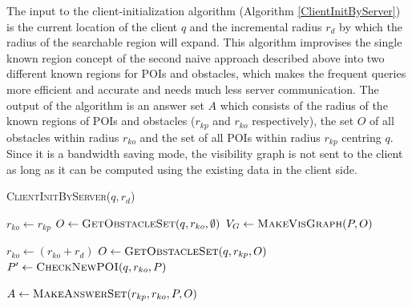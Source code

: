 \documentclass{sig-alternate}
\begin{document}
The input to the client-initialization algorithm (Algorithm \ref{ClientInitByServer}) is the current location of the client $q$ and the incremental radius $r_d$ by which the radius of the searchable region will expand. This algorithm improvises the single known region concept of the second naive approach described above into two different known regions for POIs and obstacles, which makes the frequent queries more efficient and accurate and needs much less server communication. The output of the algorithm is an answer set $A$ which consists of the radius of the known regions of POIs and obstacles ($r_{kp}$ and $r_{ko}$ respectively), the set $O$ of all obstacles within radius $r_{ko}$ and the set of all POIs within radius $r_{kp}$ centring $q$. Since it is a bandwidth saving mode, the visibility graph is not sent to the client as long as it can be computed using the existing data in the client side.

\begin{algorithm}
\caption{\textsc{ClientInitByServer}($q, r_d$)}
\label{ClientInitByServer}

    
	 $r_{ko} \gets r_{kp} $ \; %
	 $O \gets \textsc{GetObstacleSet}(q, r_{ko}, \emptyset)$ \;
	 $V_G \gets \textsc{MakeVisGraph}(P, O)$ \;
	  { 
		$r_{ko} \gets (r_{ko} + r_d)$ \;
		$O \gets \textsc{GetObstacleSet}(q, r_{kp}, O)$ \;
		$P' \gets \textsc{CheckNewPOI}(q, r_{ko}, P)$ \;
		
	} \label{while}
	
	 \Return $A \gets \textsc{MakeAnswerSet}(r_{kp}, r_{ko}, P, O)$ 
\end{algorithm}
\end{document}
